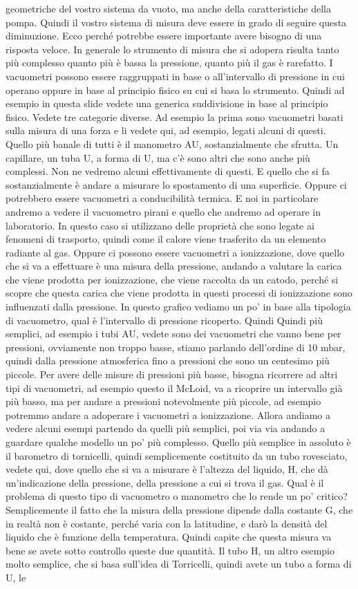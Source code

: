 geometriche del vostro sistema da vuoto, ma anche della caratteristiche della pompa. Quindi il vostro sistema di misura deve essere in grado di seguire questa diminuzione. Ecco perché potrebbe essere importante avere bisogno di una risposta veloce. In generale lo strumento di misura che si adopera risulta tanto più complesso quanto più è bassa la pressione, quanto più il gas è rarefatto. I vacuometri possono essere raggruppati in base o all'intervallo di pressione in cui operano oppure in base al principio fisico su cui si basa lo strumento. Quindi ad esempio in questa slide vedete una generica suddivisione in base al principio fisico. Vedete tre categorie diverse. Ad esempio la prima sono vacuometri basati sulla misura di una forza e li vedete qui, ad esempio, legati alcuni di questi. Quello più banale di tutti è il manometro AU, sostanzialmente che sfrutta. Un capillare, un tuba U, a forma di U, ma c'è sono altri che sono anche più complessi. Non ne vedremo alcuni effettivamente di questi. E quello che si fa sostanzialmente è andare a misurare lo spostamento di una superficie. Oppure ci potrebbero essere vacuometri a conducibilità termica. E noi in particolare andremo a vedere il vacuometro pirani e quello che andremo ad operare in laboratorio. In questo caso si utilizzano delle proprietà che sono legate ai fenomeni di trasporto, quindi come il calore viene trasferito da un elemento radiante al gas. Oppure ci possono essere vacuometri a ionizzazione, dove quello che si va a effettuare è una misura della pressione, andando a valutare la carica che viene prodotta per ionizzazione, che viene raccolta da un catodo, perché si scopre che questa carica che viene prodotta in questi processi di ionizzazione sono influenzati dalla pressione. In questo grafico vediamo un po' in base alla tipologia di vacuometro, qual è l'intervallo di pressione ricoperto. Quindi Quindi più semplici, ad esempio i tubi AU, vedete sono dei vacuometri che vanno bene per pressioni, ovviamente non troppo basse, stiamo parlando dell'ordine di 10 mbar, quindi dalla pressione atmosferica fino a pressioni che sono un centesimo più piccole. Per avere delle misure di pressioni più basse, bisogna ricorrere ad altri tipi di vacuometri, ad esempio questo il McLoid, va a ricoprire un intervallo già più basso, ma per andare a pressioni notevolmente più piccole, ad esempio potremmo andare a adoperare i vacuometri a ionizzazione. Allora andiamo a vedere alcuni esempi partendo da quelli più semplici, poi via via andando a guardare qualche modello un po' più complesso. Quello più semplice in assoluto è il barometro di tornicelli, quindi semplicemente costituito da un tubo rovesciato, vedete qui, dove quello che si va a misurare è l'altezza del liquido, H, che dà un'indicazione della pressione, della pressione a cui si trova il gas. Qual è il problema di questo tipo di vacuometro o manometro che lo rende un po' critico? Semplicemente il fatto che la misura della pressione dipende dalla costante G, che in realtà non è costante, perché varia con la latitudine, e darò la densità del liquido che è funzione della temperatura. Quindi capite che questa misura va bene se avete sotto controllo queste due quantità. Il tubo H, un altro esempio molto semplice, che si basa sull'idea di Torricelli, quindi avete un tubo a forma di U, le 